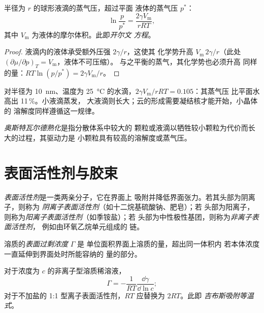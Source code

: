 \begin{theorem}[开尔文方程]\label{thm:b3:colloids:kelvin}
半径为 $r$ 的球形液滴的蒸气压，超过平面
液体的蒸气压 $p^*$：
\[
  \ln\frac{p}{p^*} = \frac{2\gamma V_{\mathrm m}}{rRT},
\]
其中 $V_{\mathrm m}$ 为液体的摩尔体积。此即\emph{开尔文
方程}。
\end{theorem}

\begin{proof}
液滴内的液体承受额外压强 $2\gamma/r$，这使其
化学势升高 $V_{\mathrm m}\,2\gamma/r$（此处 $(\partial\mu/\partial p)_T = V_{\mathrm m}$，液体不可压缩）。
与之平衡的蒸气，其化学势也必须升高
同样的量：$RT\ln(p/p^*) = 2\gamma V_{\mathrm m}/r$。
\end{proof}

对半径为 \qty{10}{nm}、温度为 \qty{25}{\celsius} 的水滴，$2\gamma V_{\mathrm m}/rRT = 0.105$：其蒸气压
比平面水高出 11\,\%。小液滴蒸发，
大液滴则长大；云的形成需要凝结核才能开始，小晶体的
溶解度同样遵循这一规律。

\begin{definition}[奥斯特瓦尔德熟化]\label{def:b3:colloids:ripening}
\emph{奥斯特瓦尔德熟化}是指分散体系中较大的
颗粒或液滴以牺牲较小颗粒为代价而长大的过程，其驱动力是
小颗粒具有较高的溶解度或蒸气压。
\end{definition}

\section{表面活性剂与胶束}

\begin{definition}[表面活性剂]\label{def:b3:colloids:surfactant}
\emph{表面活性剂}是一类两亲分子，它在界面上
吸附并降低界面张力。若其头部为阴离子，则称为
\emph{阴离子表面活性剂}（如十二烷基硫酸钠、肥皂）；若
头部为阳离子，则称为\emph{阳离子表面活性剂}（如季铵盐）；若
头部为中性极性基团，则称为\emph{非离子表面活性剂}，
例如由环氧乙烷单元组成的
链。
\end{definition}

\begin{definition}[表面过剩浓度]\label{def:b3:colloids:surface-excess}
溶质的\emph{表面过剩浓度} $\Gamma$ 是
单位面积界面上溶质的量，超出同一体积内
若本体浓度一直延伸到界面处时所能容纳的
量的部分。
\end{definition}

\begin{theorem}[吉布斯吸附等温式]\label{thm:b3:colloids:gibbs-adsorption}
对于浓度为 $c$ 的非离子型溶质稀溶液，
\[
  \Gamma = -\frac{1}{RT}\frac{\dd\gamma}{\dd\ln c};
\]
对于不加盐的 1:1 型离子表面活性剂，$RT$ 应替换为 $2RT$。此即
\emph{吉布斯吸附等温式}。
\end{theorem}

